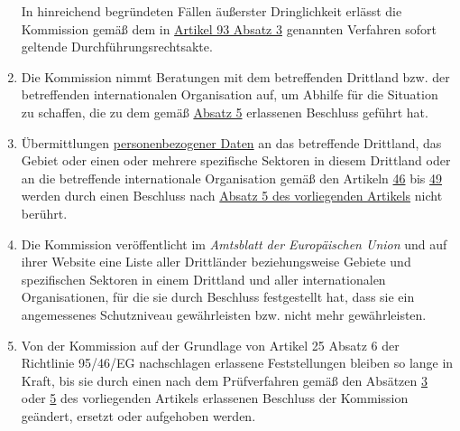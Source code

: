 \begin{enumerate}
   In hinreichend begründeten Fällen äußerster Dringlichkeit erlässt die Kommission gemäß dem in \hyperref[itm:93-3]
   {Artikel 93 Absatz 3} genannten Verfahren sofort geltende Durchführungsrechtsakte.

  \item Die Kommission nimmt Beratungen mit dem betreffenden Drittland bzw. der betreffenden internationalen
   Organisation auf, um Abhilfe für die Situation zu schaffen, die zu dem gemäß \hyperref[itm:45-5]{Absatz 5}
   erlassenen Beschluss geführt hat.
  \label{itm:45-6}

  \item Übermittlungen \hyperref[itm:04-1]{personenbezogener Daten} an das betreffende Drittland, das Gebiet oder einen oder mehrere
   spezifische Sektoren in diesem Drittland oder an die betreffende internationale Organisation gemäß den Artikeln
   \hyperref[ch:46]{46} bis \hyperref[ch:49]{49} werden durch einen Beschluss nach \hyperref[itm:45-5]{Absatz 5 des
    vorliegenden Artikels} nicht berührt.
  \label{itm:45-7}

  \item Die Kommission veröffentlicht im \emph{Amtsblatt der Europäischen Union} und auf ihrer Website eine Liste aller
   Drittländer beziehungsweise Gebiete und spezifischen Sektoren in einem Drittland und aller internationalen
   Organisationen, für die sie durch Beschluss festgestellt hat, dass sie ein angemessenes Schutzniveau gewährleisten
   bzw. nicht mehr gewährleisten.   
  \label{itm:45-8}

  \item Von der Kommission auf der Grundlage von Artikel 25 Absatz 6 der Richtlinie 95/46/EG\todo
   {nachschlagen} erlassene Feststellungen bleiben so lange in Kraft, bis sie durch einen nach dem Prüfverfahren gemäß
   den Absätzen \hyperref[itm:45-3]{3} oder \hyperref[itm:45-5]{5} des vorliegenden Artikels erlassenen Beschluss der
   Kommission geändert, ersetzt oder aufgehoben werden.
  \label{itm:45-9}

\end{enumerate}


